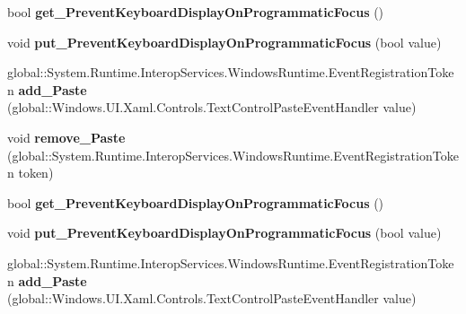 \begin{DoxyCompactItemize}
bool {\bfseries get\+\_\+\+Prevent\+Keyboard\+Display\+On\+Programmatic\+Focus} ()
\item 
\mbox{\label{interface_windows_1_1_u_i_1_1_xaml_1_1_controls_1_1_i_text_box2_ab3b1068c9dd07e6d49f63070a27551f4}} 
void {\bfseries put\+\_\+\+Prevent\+Keyboard\+Display\+On\+Programmatic\+Focus} (bool value)
\item 
\mbox{\label{interface_windows_1_1_u_i_1_1_xaml_1_1_controls_1_1_i_text_box2_af0c1b156b0a6aa5c1695e2b35cee2f48}} 
global\+::\+System.\+Runtime.\+Interop\+Services.\+Windows\+Runtime.\+Event\+Registration\+Token {\bfseries add\+\_\+\+Paste} (global\+::\+Windows.\+U\+I.\+Xaml.\+Controls.\+Text\+Control\+Paste\+Event\+Handler value)
\item 
\mbox{\label{interface_windows_1_1_u_i_1_1_xaml_1_1_controls_1_1_i_text_box2_a269082d94ab6b91935799f8f5f0b945d}} 
void {\bfseries remove\+\_\+\+Paste} (global\+::\+System.\+Runtime.\+Interop\+Services.\+Windows\+Runtime.\+Event\+Registration\+Token token)
\item 
\mbox{\label{interface_windows_1_1_u_i_1_1_xaml_1_1_controls_1_1_i_text_box2_a8af2302feaec834a42dc8d7416d40f7e}} 
bool {\bfseries get\+\_\+\+Prevent\+Keyboard\+Display\+On\+Programmatic\+Focus} ()
\item 
\mbox{\label{interface_windows_1_1_u_i_1_1_xaml_1_1_controls_1_1_i_text_box2_ab3b1068c9dd07e6d49f63070a27551f4}} 
void {\bfseries put\+\_\+\+Prevent\+Keyboard\+Display\+On\+Programmatic\+Focus} (bool value)
\item 
\mbox{\label{interface_windows_1_1_u_i_1_1_xaml_1_1_controls_1_1_i_text_box2_af0c1b156b0a6aa5c1695e2b35cee2f48}} 
global\+::\+System.\+Runtime.\+Interop\+Services.\+Windows\+Runtime.\+Event\+Registration\+Token {\bfseries add\+\_\+\+Paste} (global\+::\+Windows.\+U\+I.\+Xaml.\+Controls.\+Text\+Control\+Paste\+Event\+Handler value)
\item 

\end{DoxyCompactItemize}

